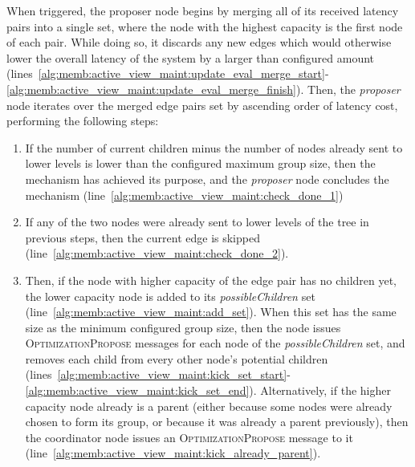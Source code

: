 When triggered, the proposer node begins by merging all of its received latency pairs into a single set, where the node with the highest capacity is the first node of each pair. While doing so, it discards any new edges which would otherwise lower the overall latency of the system by a larger than configured amount (lines~\ref{alg:memb:active_view_maint:update_eval_merge_start}-\ref{alg:memb:active_view_maint:update_eval_merge_finish}). Then, the \textit{proposer} node iterates over the merged edge pairs set by ascending order of latency cost, performing the following steps:

\begin{enumerate}
    \item If the number of current children minus the number of nodes already sent to lower levels is lower than the configured maximum group size, then the mechanism has achieved its purpose, and the \textit{proposer} node concludes the mechanism (line~\ref{alg:memb:active_view_maint:check_done_1})
    
    \item If any of the two nodes were already sent to lower levels of the tree in previous steps, then the current edge is skipped (line~\ref{alg:memb:active_view_maint:check_done_2}).
    
    \item Then, if the node with higher capacity of the edge pair has no children yet, the lower capacity node is added to its \textit{possibleChildren} set (line~\ref{alg:memb:active_view_maint:add_set}). When this set has the same size as the minimum configured group size, then the node issues \textsc{OptimizationPropose} messages for each node of the \textit{possibleChildren} set, and removes each child from every other node's potential children (lines~\ref{alg:memb:active_view_maint:kick_set_start}-\ref{alg:memb:active_view_maint:kick_set_end}). Alternatively, if the higher capacity node already is a parent (either because some nodes were already chosen to form its group, or because it was already a parent previously), then the coordinator node issues an \textsc{OptimizationPropose} message to it (line~\ref{alg:memb:active_view_maint:kick_already_parent}).
\end{enumerate}

